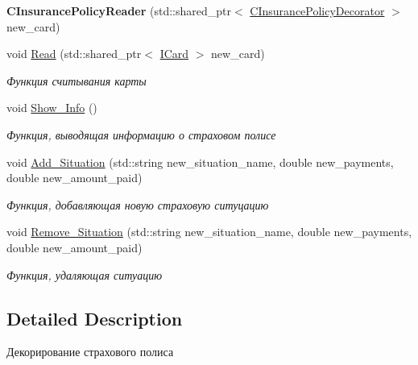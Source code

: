 \begin{DoxyCompactItemize}
\item 
{\bfseries C\+Insurance\+Policy\+Reader} (std\+::shared\+\_\+ptr$<$ \hyperlink{classCInsurancePolicyDecorator}{C\+Insurance\+Policy\+Decorator} $>$ new\+\_\+card)\hypertarget{classCInsurancePolicyReader_ab5c43e8d7a654cd32c62b90ca6ca1ded}{}\label{classCInsurancePolicyReader_ab5c43e8d7a654cd32c62b90ca6ca1ded}

\item 
void \hyperlink{classCInsurancePolicyReader_a8cb59f3873454c17fbc03bc4dd9ee07c}{Read} (std\+::shared\+\_\+ptr$<$ \hyperlink{classICard}{I\+Card} $>$ new\+\_\+card)
\begin{DoxyCompactList}\small\item\em Функция считывания карты \end{DoxyCompactList}\item 
void \hyperlink{classCInsurancePolicyReader_ab8014e3d641ba2039c320e31bfd1eacb}{Show\+\_\+\+Info} ()\hypertarget{classCInsurancePolicyReader_ab8014e3d641ba2039c320e31bfd1eacb}{}\label{classCInsurancePolicyReader_ab8014e3d641ba2039c320e31bfd1eacb}

\begin{DoxyCompactList}\small\item\em Функция, выводящая информацию о страховом полисе \end{DoxyCompactList}\item 
void \hyperlink{classCInsurancePolicyReader_a21dc3cbbe3ea49e2848520ce86c7ead4}{Add\+\_\+\+Situation} (std\+::string new\+\_\+situation\+\_\+name, double new\+\_\+payments, double new\+\_\+amount\+\_\+paid)
\begin{DoxyCompactList}\small\item\em Функция, добавляющая новую страховую ситуцацию \end{DoxyCompactList}\item 
void \hyperlink{classCInsurancePolicyReader_aabe91378662a755bc82a9876f62eef5a}{Remove\+\_\+\+Situation} (std\+::string new\+\_\+situation\+\_\+name, double new\+\_\+payments, double new\+\_\+amount\+\_\+paid)
\begin{DoxyCompactList}\small\item\em Функция, удаляющая ситуацию \end{DoxyCompactList}\end{DoxyCompactItemize}


\subsection{Detailed Description}
Декорирование страхового полиса 

